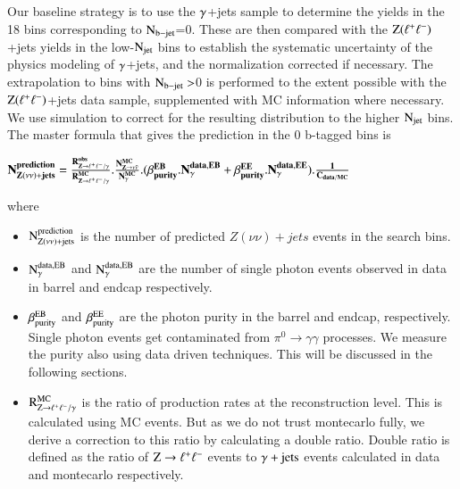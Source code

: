 Our baseline strategy is to use the $\rm \gamma$+jets  sample to determine the
yields in the 18 bins corresponding to $\rm N_{b-jet}$=0.  These are
then compared with the $\rm Z(\ell^{+} \ell^{-})$+jets yields in the low-$\rm N_{jet}$
bins to establish the systematic uncertainty of the physics modeling of
$\rm \gamma$+jets, and the normalization corrected if necessary.  
The extrapolation to bins with $\rm N_{b-jet} >$0 is performed to
the extent possible with the $\rm Z(\ell^{+} \ell^{-})$+jets data sample, supplemented with MC
information where necessary. We use simulation to correct for the
resulting distribution to the higher $\rm N_{jet}$ bins. The master formula that gives the prediction in the 0 b-tagged bins is



$\bf  N_{Z(\nu\nu)+jets}^{prediction} = \frac{R^{obs}_{Z\rightarrow\ell^{+}\ell^{-}/\gamma}}{R^{MC}_{Z\rightarrow\ell^{+}\ell^{-}/\gamma}} . \frac{N_{Z\rightarrow \nu\bar{\nu}}^{MC}}{N_{\gamma}^{MC}} . (\beta^{EB}_{purity}.N^{data,EB}_{\gamma}+ \beta^{EE}_{purity}.N^{data,EE}_{\gamma}). \frac{1}{C_{data/MC}}$




where 

\begin{itemize}

\item $\bf \rm N_{Z(\nu\nu)+\rm jets}^{prediction}$ is the number of predicted $Z(\nu\nu)+jets$ events in the search bins.


\item $\bf \rm N^{data,EB}_{\gamma}$ and $\rm N^{data,EB}_{\gamma}$ are the number of single photon events observed in data in barrel and endcap respectively.


\item  $\bf \rm \beta^{EB}_{purity}$ and $\beta^{\rm EE}_{\rm purity}$ are the photon purity in the barrel and endcap, respectively. Single photon events get contaminated from $\pi^{0} \rightarrow \gamma\gamma$ processes. We measure the purity also using data driven techniques. This will be discussed in the following sections. 



\item $\bf \rm R^{MC}_{Z\rightarrow\ell^{+}\ell^{-}/\gamma}$ is the ratio of production rates at the reconstruction level. This is calculated using MC events. But as we do not trust montecarlo fully, we derive a correction to this ratio by calculating a double ratio. Double ratio is defined as the ratio of  $\rm Z\rightarrow\ell^{+}\ell^{-}$ events to $\rm \gamma + jets$ events calculated in data and montecarlo respectively.


\end{itemize}


